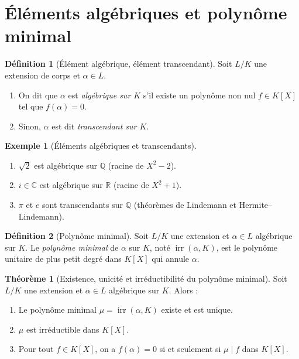 \documentclass[12pt,a4paper,openany]{book}
\theoremstyle{definition}
\newtheorem{definition}{Définition}[chapter]
\newtheorem{theoreme}{Théorème}[chapter]
\newtheorem{exemple}{Exemple}[chapter]
\newcommand{\Q}{\mathbb{Q}}
\newcommand{\R}{\mathbb{R}}
\newcommand{\C}{\mathbb{C}}
\newcommand{\irr}{\operatorname{irr}}
\begin{document}
\section{Éléments algébriques et polynôme minimal}
\label{sec:elements-algebriques}

\begin{definition}[Élément algébrique, élément transcendant]\label{def:algebrique}
Soit $L/K$ une extension de corps et $\alpha \in L$.
\begin{enumerate}[label=(\roman*)]
  \item On dit que $\alpha$ est \emph{algébrique sur $K$} s'il existe un
    polynôme non nul $f \in K[X]$ tel que $f(\alpha) = 0$.
  \item Sinon, $\alpha$ est dit \emph{transcendant sur $K$}.
\end{enumerate}
\end{definition}

\begin{exemple}[Éléments algébriques et transcendants]\label{ex:alg-trans}
\begin{enumerate}[label=(\alph*)]
  \item $\sqrt{2}$ est algébrique sur $\Q$ (racine de $X^2 - 2$).
  \item $i \in \C$ est algébrique sur $\R$ (racine de $X^2 + 1$).
  \item $\pi$ et $e$ sont transcendants sur $\Q$ (théorèmes de Lindemann et
    Hermite--Lindemann).
\end{enumerate}
\end{exemple}

\begin{definition}[Polynôme minimal]\label{def:polymin}
Soit $L/K$ une extension et $\alpha \in L$ algébrique sur $K$. Le \emph{polynôme
minimal} de $\alpha$ sur $K$, noté $\irr(\alpha, K)$, est le polynôme unitaire
de plus petit degré dans $K[X]$ qui annule $\alpha$.
\end{definition}

\begin{theoreme}[Existence, unicité et irréductibilité du polynôme minimal]
\label{thm:polymin}
Soit $L/K$ une extension et $\alpha \in L$ algébrique sur $K$. Alors :
\begin{enumerate}[label=(\roman*)]
  \item Le polynôme minimal $\mu = \irr(\alpha, K)$ existe et est unique.
  \item $\mu$ est irréductible dans $K[X]$.
  \item Pour tout $f \in K[X]$, on a $f(\alpha) = 0$ si et seulement si
    $\mu \mid f$ dans $K[X]$.
\end{enumerate}
\end{theoreme}
\end{document}

